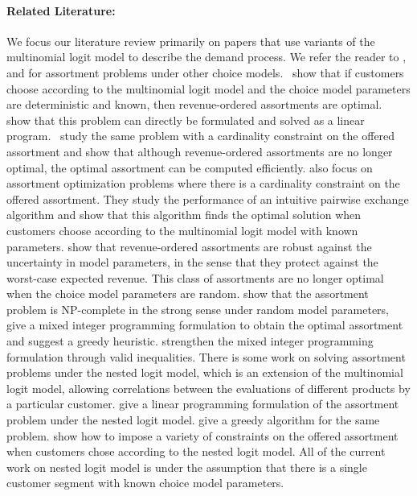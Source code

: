 \paragraph{Related Literature:} We focus our literature review primarily on papers that use variants of the multinomial logit model to describe the demand process. We refer the reader to \cite{KokFV2006}, \cite{FaJaSh11} and \cite{FaJaSh12} for assortment problems under other choice models.~\cite{TalluriVanRyzin:2004} show that if  customers choose according to the multinomial logit model and the choice model parameters are deterministic and known, then revenue-ordered assortments are optimal.~\cite{GaRa11} show that this problem can directly be formulated and solved as a linear program.~\cite{RoShSh10} study the same problem with a cardinality constraint on the offered assortment and show that although revenue-ordered assortments are no longer optimal, the optimal assortment can be computed efficiently. \cite{JaFa11} also focus on assortment optimization problems where there is a cardinality constraint on the offered assortment. They study the performance of an intuitive pairwise exchange algorithm and show that this algorithm finds the optimal solution when customers choose according to the multinomial logit model with known parameters. \cite{RT:2009} show that revenue-ordered assortments are robust against the uncertainty in model parameters, in the sense that they protect against the worst-case expected revenue. This class of assortments are no longer optimal when the choice model parameters are random. \cite{BrontMendezVulcano:2009} show that the assortment problem is NP-complete in the strong sense under random model parameters, give a mixed integer programming formulation to obtain the optimal assortment and suggest a greedy heuristic. \cite{DiBr11} strengthen the mixed integer programming formulation through valid inequalities. There is some work on solving assortment problems under the nested logit model, which is an extension of the multinomial logit model, allowing correlations between the evaluations of different products by a particular customer. \cite{DavisEtal:2012} give a linear programming formulation of the assortment problem under the nested logit model. \cite{LiRusmevichientong:2012} give a greedy algorithm for the same problem. \cite{GallegoTopaloglu:2012} show how to impose a variety of constraints on the offered assortment when customers chose according to the nested logit model. All of the current work on nested logit model is under the assumption that 
there is a single customer segment with known choice model parameters.


